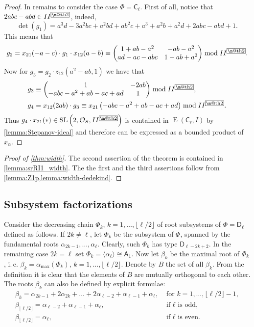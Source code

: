 \documentclass[oneside, 12pt]{amsart}
\makeatletter
\theoremstyle{plain}
\numberwithin{equation}{section}
\numberwithin{lemma}{section}
\theoremstyle{definition}
\theoremstyle{remark}
\DeclareMathOperator{\SL}{SL}
\DeclareMathOperator{\E}{E}
\newcommand{\rA}{\mathsf{A}}
\newcommand{\rC}{\mathsf{C}}
\newcommand{\rD}{\mathsf{D}}
\newcommand{\indexbox}[1]{\text{\fboxsep=.1em\fbox{\m@th$\displaystyle#1$}}}
\makeatother
\begin{document}
\begin{proof}
In remains to consider the case $\Phi=\rC_\ell$. First of all, notice that $2abc-abd\in II^{\indexbox{2}}$, indeed,
\[ \det(g_1)=a^3d-3a^2bc+a^2bd+ab^2c+a^3+a^2b+a^2d+2abc-abd+1. \]
This means that
\[ g_2=x_{21}(-a-c)\cdot g_1\cdot x_{12}(a-b)\equiv
\begin{pmatrix}
1+ab-a^2 & -ab-a^2 \\ ad-ac-abc & 1-ab+a^2
\end{pmatrix}\bmod II^{\indexbox{2}}. \]
Now for $g_3=g_2\cdot z_{12}\left(a^2-ab, 1\right)$ we have that
\begin{align*}
& g_3\equiv\begin{pmatrix} 1 & -2ab \\ -abc-a^2+ab-ac+ad & 1 \end{pmatrix}\bmod II^{\indexbox{2}}, \\
& g_4=x_{12}(2ab)\cdot g_3\equiv x_{21}\left(-abc-a^2+ab-ac+ad\right)\bmod II^{\indexbox{2}}.
\end{align*}
Thus $g_4\cdot x_{21}(*)\in\SL\left(2, \mathcal{O}_S, II^{\indexbox{2}}\right)$ is contained in $\E(\rC_\ell, I)$ by \cref{lemma:Stepanov-ideal} and therefore can be expressed as a bounded product of $x_\alpha$.
\end{proof}

\begin{proof}[Proof of \cref{thm:width}] The second assertion of the theorem is contained in \cref{lemma:srRI1_width}.
The the first and the third assertions follow from \cref{lemma:Z1p,lemma:width-dedekind}. \end{proof}

\subsection{Subsystem factorizations}\label{sec:subsysfact}
Consider the decreasing chain $\Phi_k$, $k=1, \ldots, \lfloor \ell/2 \rfloor$ of root subsystems of $\Phi=\rD_\ell$ defined as follows.
If $2k \neq \ell$, let $\Phi_k$ be the subsystem of $\Phi$, spanned by the fundamental roots $\alpha_{2k-1}, \ldots, \alpha_\ell$.
Clearly, such $\Phi_k$ has type $\rD_{\ell-2k+2}$. 
In the remaining case $2k = \ell$ set $\Phi_k = \langle \alpha_\ell \rangle \cong \rA_1$.
Now let $\beta_k$ be the maximal root of $\Phi_k$, i.\,e. $\beta_k = \alpha_\mathrm{max}(\Phi_k)$, $k=1, \ldots, \lfloor \ell/2 \rfloor$.
Denote by $B$ the set of all $\beta_k$. From the definition it is clear that the elements of $B$ are mutually orthogonal to each other.
The roots $\beta_k$ can also be defined by explicit formulae:
\begin{align*}
 \beta_k =  \alpha_{2k-1} + 2\alpha_{2k}+ \ldots + 2\alpha_{\ell-2} + \alpha_{\ell-1} + \alpha_\ell, & \text{ for } k=1, \ldots, \lfloor\ell/2\rfloor-1, \\
 \beta_{\lfloor\ell/2\rfloor} = \alpha_{\ell-2}+\alpha_{\ell-1}+\alpha_\ell, & \text{ if $\ell$ is odd, } \\
 \beta_{\lfloor\ell/2\rfloor} = \alpha_\ell, & \text{ if $\ell$ is even.}
\end{align*}
\end{document}

